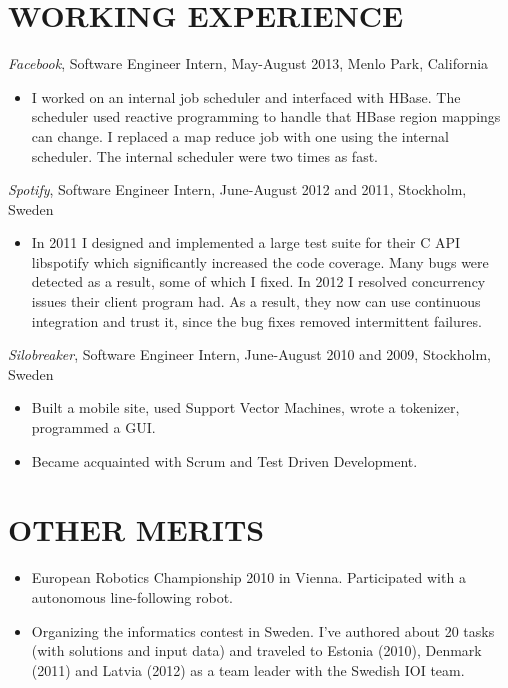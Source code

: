 \documentclass[11pt]{res} %
\begin{document}
\begin{resume}
\section{WORKING EXPERIENCE}
\emph{Facebook}, {\footnotesize Software Engineer Intern, May-August 2013}, Menlo Park, California
\vspace{0.2in}
   \begin{itemize}
   \item I worked on an internal job scheduler and interfaced with HBase. The
     scheduler used reactive programming to handle that HBase region mappings
     can change. I replaced a map reduce job with one using the internal
     scheduler. The internal scheduler were two times as fast.
 \end{itemize}

 \emph{Spotify}, {\footnotesize Software Engineer Intern, June-August 2012 and 2011}, Stockholm, Sweden
\vspace{0.2in}
   \begin{itemize} %
   \item In 2011 I designed and implemented a large test suite for their C API
     libspotify which significantly increased the code coverage. Many bugs were
     detected as a result, some of which I fixed. In 2012 I resolved
     concurrency issues their client program had. As a result, they now can use
     continuous integration and trust it, since the bug fixes removed
     intermittent failures.

 \end{itemize}


 \emph{Silobreaker}, {\footnotesize Software Engineer Intern, June-August 2010 and 2009}, Stockholm, Sweden
\vspace{0.2in}
 \begin{itemize} %
  \item Built a mobile site, used Support Vector Machines, wrote a tokenizer,
   programmed a GUI.
  \item Became acquainted with Scrum and Test Driven Development.
\end{itemize}

\section{OTHER MERITS}

   \begin{itemize} %
   \item European Robotics Championship 2010 in Vienna.
    Participated with a autonomous line-following robot.
   \item Organizing the informatics contest in Sweden.  I've authored about
     20 tasks (with solutions and input data) and traveled to Estonia (2010),
     Denmark (2011) and Latvia (2012) as a team leader with the Swedish IOI
     team.
 \end{itemize}

\end{resume}
\end{document}

